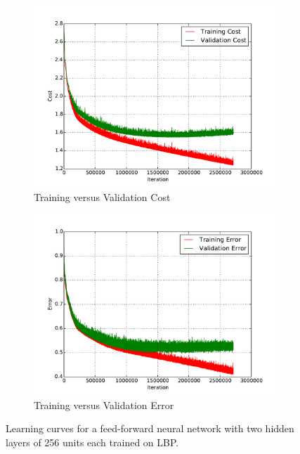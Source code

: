 \begin{figure}[H]
	\centering
	\begin{subfigure}[b]{0.45\linewidth}
		\centering
		\includegraphics[width=\linewidth]{images/0/train_val_cost.pdf}
		\caption{Training versus Validation Cost}
	\end{subfigure}
	\hfill
	\begin{subfigure}[b]{0.45\linewidth}
		\centering
		\includegraphics[width=\linewidth]{images/0/train_val_error.pdf}
		\caption{Training versus Validation Error}
	\end{subfigure}
	\caption{Learning curves for a feed-forward neural network with two hidden layers of 256 units each trained on LBP.}
	\label{shrine0_curves}
\end{figure}

